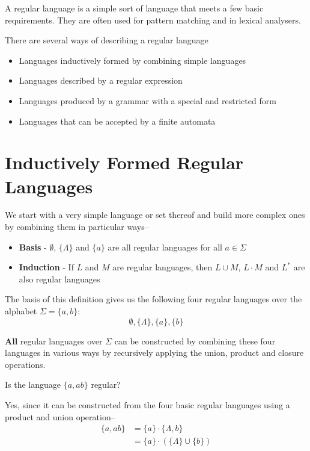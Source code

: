 
A regular language is a simple sort of language that meets a few basic requirements. They are often used for pattern
 matching and in lexical analysers.

\begin{definition*}{}{}
  There are several ways of describing a regular language
  \begin{itemize}
    \item Languages inductively formed by combining simple languages
    \item Languages described by a regular expression
    \item Languages produced by a grammar with a special and restricted form
    \item Languages that can be accepted by a finite automata
  \end{itemize}
\end{definition*}

\section*{Inductively Formed Regular Languages}

We start with a very simple language or set thereof and build more complex ones by combining them in particular ways--

\begin{itemize}
  \item \textbf{Basis} - $\emptyset$, $\{\Lambda\}$ and $\{a\}$ are all regular languages for all $a \in \Sigma$
  \item \textbf{Induction} - If $L$ and $M$ are regular languages, then $L \cup M$, $L \cdot M$ and $L^*$ are also
   regular languages
\end{itemize}

The basis of this definition gives us the following four regular languages over the alphabet $\Sigma = \{a, b\}$:
\begin{equation*}
  \emptyset, \{\Lambda\}, \{a\}, \{b\}
\end{equation*}

\textbf{All} regular languages over $\Sigma$ can be constructed by combining these four languages in various ways by
 recursively applying the union, product and closure operations.

\begin{example*}{}{}
  Is the language $\{a, ab\}$ regular?

  Yes, since it can be constructed from the four basic regular languages using a product and union operation--
  \begin{align*}
    \{a, ab\} &= \{a\} \cdot \{\Lambda, b\}\\
    &= \{a\} \cdot (\{\Lambda\} \cup \{b\})
  \end{align*}
\end{example*}


